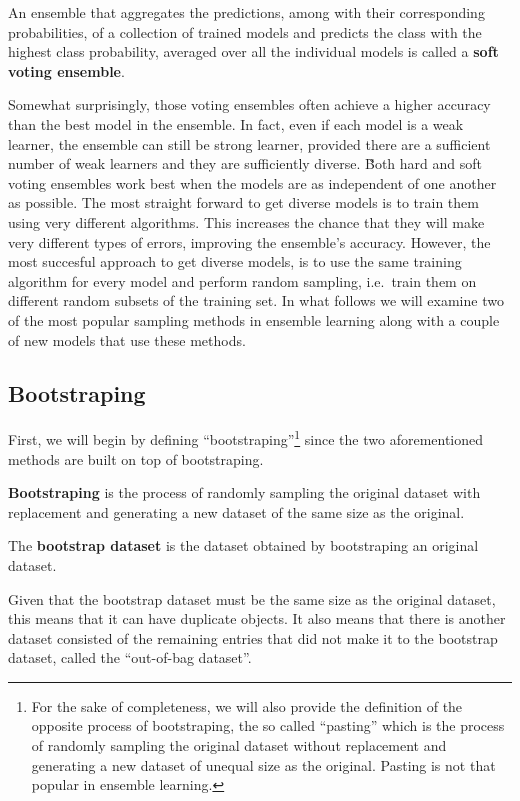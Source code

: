 An ensemble that aggregates the predictions, among with their corresponding probabilities, of a collection of trained
models and predicts the class with the highest class probability, averaged over all the individual models is called a
\textbf{soft voting ensemble}.
\ed


Somewhat surprisingly, those voting ensembles often achieve a higher accuracy than the best model in the ensemble.
In fact, even if each model is a weak learner, the ensemble can still be strong learner, provided there are a
sufficient number of weak learners and they are sufficiently diverse. \v

Both hard and soft voting ensembles work best when the models are as independent of one another as possible. The
most straight forward to get diverse models is to train them using very different algorithms. This increases the
chance that they will make very different types of errors, improving the ensemble's accuracy. However, the most
succesful approach to get diverse models, is to use the same training algorithm for every model and perform random
sampling, i.e.\ train them on different random subsets of the training set. In what follows we will examine two of
the most popular sampling methods in ensemble learning along with a couple of new models that use these methods.

\subsection{Bootstraping}

First, we will begin by defining ``bootstraping''\footnote{For the sake of completeness, we will also provide the
definition of the opposite process of bootstraping, the so called ``pasting'' which is the process of randomly sampling
the original dataset without replacement and generating a new dataset of unequal size as the original. Pasting is not
that popular in ensemble learning.} since the two aforementioned methods are built on top of bootstraping.

\bd[Bootstraping]
\textbf{Bootstraping} is the process of randomly sampling the original dataset with replacement and generating a new
dataset of the same size as the original.
\ed

The \textbf{bootstrap dataset} is the dataset obtained by bootstraping an original dataset.
\ed

Given that the bootstrap dataset must be the same size as the original dataset, this means that it can have
duplicate objects. It also means that there is another dataset consisted of the remaining entries that did not
make it to the bootstrap dataset, called the ``out-of-bag dataset''.

